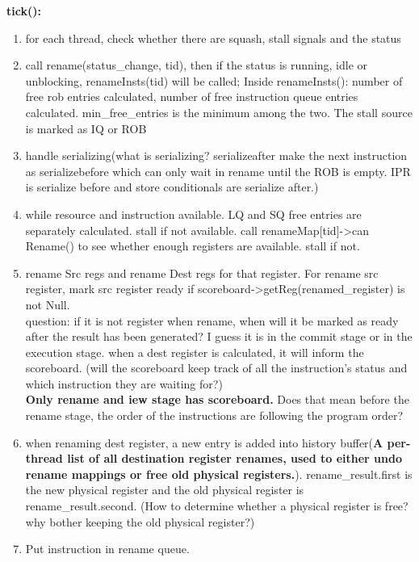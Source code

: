 \documentclass[11pt]{article}
\begin{document}
\textbf{tick():\\}

\begin{enumerate}
	\item for each thread, check whether there are squash, stall signals and the status
	
	\item call rename(status\_change, tid), then if the status is running, idle or unblocking, renameInsts(tid) will be called; Inside renameInsts(): number of free rob entries calculated, number of free instruction queue entries calculated. min\_free\_entries is the minimum among the two. The stall source is marked as IQ or ROB
	
	\item handle serializing(what is serializing? serializeafter make the next instruction as serializebefore which can only wait in rename until the ROB is empty. IPR is serialize before and store conditionals are serialize after.)
	
	\item while resource and instruction available. LQ and SQ free entries are separately calculated. stall if not available. call renameMap[tid]->can Rename() to see whether enough registers are available. stall if not.
	
	\item rename Src regs and rename Dest regs for that register. For rename src register, mark src register ready if scoreboard-\textgreater getReg(renamed\_register) is not Null.\\
	
	question: if it is not register when rename, when will it be marked as ready after the result has been generated? I guess it is in the commit stage or in the execution stage. when a dest register is calculated, it will inform the scoreboard. (will the scoreboard keep track of all the instruction's status and which instruction they are waiting for?)\\
	
	\textbf{Only rename and iew stage has scoreboard.} Does that mean before the rename stage, the order of the instructions are following the program order?
	
	\item when renaming dest register, a new entry is added into history buffer(\textbf{A per-thread list of all destination register renames, used to either undo rename mappings or free old physical registers.}). rename\_result.first is the new physical register and the old physical register is rename\_result.second. (How to determine whether a physical register is free? why bother keeping the old physical register?)
	
	\item Put instruction in rename queue.
\end{enumerate}
\end{document}
